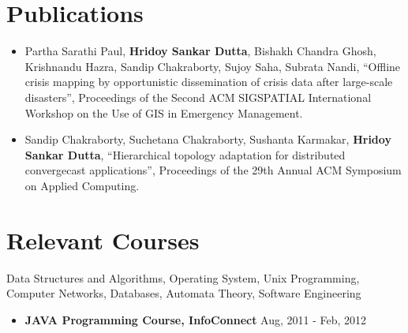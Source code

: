 \documentclass[margin, centered]{res}
\begin{document}
\begin{resume}

\section{Publications}
\begin{itemize}[leftmargin=*]
\item Partha Sarathi Paul, \textbf{Hridoy Sankar Dutta}, Bishakh Chandra Ghosh, Krishnandu Hazra, Sandip Chakraborty, Sujoy Saha, Subrata Nandi, ``Offline crisis mapping by opportunistic dissemination of crisis data after large-scale disasters'', Proceedings of the Second ACM SIGSPATIAL International Workshop on the Use of GIS in Emergency Management.
\item Sandip Chakraborty, Suchetana Chakraborty, Sushanta Karmakar, \textbf{Hridoy Sankar Dutta}, ``Hierarchical topology adaptation for distributed convergecast applications'', Proceedings of the 29th Annual ACM Symposium on Applied Computing.
\end{itemize}

\section{Relevant \hspace{2mm} Courses}
Data Structures and Algorithms, Operating System, Unix Programming, Computer Networks, Databases, Automata Theory, Software Engineering
\begin{itemize}[leftmargin=*]
\item \textbf{JAVA Programming Course, InfoConnect} \hfill Aug, 2011 - Feb, 2012 \\
\end{itemize}

\end{resume}
\end{document}
